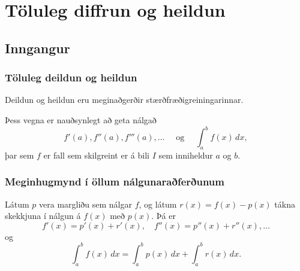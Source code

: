 \documentclass[icelandic,a4paper,12pt]{article}
\begin{document}
\section{Töluleg diffrun og heildun}




\subsection{Inngangur}

\subsubsection{Töluleg deildun og heildun  }  
Deildun og heildun eru meginaðgerðir stærðfræðigreiningarinnar.

Þess vegna er nauðsynlegt að geta nálgað
\begin{equation*}
  f'(a),f''(a),f'''(a),\dots \quad 
  \text{ og } \quad
  \int_a^b f(x)\, dx,
\end{equation*}
þar sem $f$ er fall sem skilgreint er á bili $I$ sem inniheldur $a$ og $b$.  



\subsubsection{Meginhugmynd í öllum nálgunaraðferðunum}
Látum $p$ vera margliðu sem nálgar $f$, \pause
og látum $r(x)=f(x)-p(x)$ tákna skekkjuna í nálgun á $f(x)$ með $p(x)$.  Þá er 
$$
  f'(x)=p'(x)+r'(x), \quad f''(x)=p''(x)+r''(x), \dots 
$$
og
$$ 
  \int_a^b f(x)\, dx=\int_a^b p(x)\, dx+\int_a^b r(x)\, dx.
$$
\end{document}

